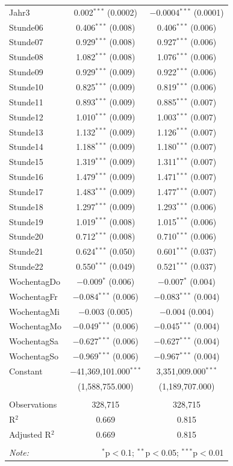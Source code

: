 \documentclass[a4paper,12pt]{thesis}
\begin{document}
\begin{longtable}{@{\extracolsep{-5pt}}lcc}
		Jahr3 & 0.002$^{***}$ (0.0002) & $-$0.0004$^{***}$ (0.0001) \\ 
		Stunde06 & 0.406$^{***}$ (0.008) & 0.406$^{***}$ (0.006) \\ 
		Stunde07 & 0.929$^{***}$ (0.008) & 0.927$^{***}$ (0.006) \\ 
		Stunde08 & 1.082$^{***}$ (0.008) & 1.076$^{***}$ (0.006) \\ 
		Stunde09 & 0.929$^{***}$ (0.009) & 0.922$^{***}$ (0.006) \\ 
		Stunde10 & 0.825$^{***}$ (0.009) & 0.819$^{***}$ (0.006) \\ 
		Stunde11 & 0.893$^{***}$ (0.009) & 0.885$^{***}$ (0.007) \\ 
		Stunde12 & 1.010$^{***}$ (0.009) & 1.003$^{***}$ (0.007) \\ 
		Stunde13 & 1.132$^{***}$ (0.009) & 1.126$^{***}$ (0.007) \\ 
		Stunde14 & 1.188$^{***}$ (0.009) & 1.180$^{***}$ (0.007) \\ 
		Stunde15 & 1.319$^{***}$ (0.009) & 1.311$^{***}$ (0.007) \\ 
		Stunde16 & 1.479$^{***}$ (0.009) & 1.471$^{***}$ (0.007) \\ 
		Stunde17 & 1.483$^{***}$ (0.009) & 1.477$^{***}$ (0.007) \\ 
		Stunde18 & 1.297$^{***}$ (0.009) & 1.293$^{***}$ (0.006) \\ 
		Stunde19 & 1.019$^{***}$ (0.008) & 1.015$^{***}$ (0.006) \\ 
		Stunde20 & 0.712$^{***}$ (0.008) & 0.710$^{***}$ (0.006) \\ 
		Stunde21 & 0.624$^{***}$ (0.050) & 0.601$^{***}$ (0.037) \\ 
		Stunde22 & 0.550$^{***}$ (0.049) & 0.521$^{***}$ (0.037) \\ 
		WochentagDo & $-$0.009$^{*}$ (0.006) & $-$0.007$^{*}$ (0.004) \\ 
		WochentagFr & $-$0.084$^{***}$ (0.006) & $-$0.083$^{***}$ (0.004) \\ 
		WochentagMi & $-$0.003 (0.005) & $-$0.004 (0.004) \\ 
		WochentagMo & $-$0.049$^{***}$ (0.006) & $-$0.045$^{***}$ (0.004) \\ 
		WochentagSa & $-$0.627$^{***}$ (0.006) & $-$0.627$^{***}$ (0.004) \\ 
		WochentagSo & $-$0.969$^{***}$ (0.006) & $-$0.967$^{***}$ (0.004) \\ 
		Constant & $-$41,369,101.000$^{***}$ & 3,351,009.000$^{***}$  \\ 
		 & (1,588,755.000) & (1,189,707.000) \\ 
		\hline \\[-1.8ex] 
		Observations & 328,715 & 328,715 \\ 
		R$^{2}$ & 0.669 & 0.815 \\ 
		Adjusted R$^{2}$ & 0.669 & 0.815 \\ 
		\hline 
		\hline \\[-1.8ex] 
		\textit{Note:}  & \multicolumn{2}{r}{$^{*}$p$<$0.1; $^{**}$p$<$0.05; $^{***}$p$<$0.01} \\ 
	\end{longtable}
\end{document}
